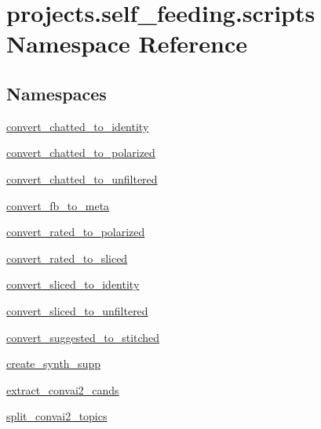 \hypertarget{namespaceprojects_1_1self__feeding_1_1scripts}{}\section{projects.\+self\+\_\+feeding.\+scripts Namespace Reference}
\label{namespaceprojects_1_1self__feeding_1_1scripts}
\subsection*{Namespaces}
\begin{DoxyCompactItemize}
\item 
 \hyperlink{namespaceprojects_1_1self__feeding_1_1scripts_1_1convert__chatted__to__identity}{convert\+\_\+chatted\+\_\+to\+\_\+identity}
\item 
 \hyperlink{namespaceprojects_1_1self__feeding_1_1scripts_1_1convert__chatted__to__polarized}{convert\+\_\+chatted\+\_\+to\+\_\+polarized}
\item 
 \hyperlink{namespaceprojects_1_1self__feeding_1_1scripts_1_1convert__chatted__to__unfiltered}{convert\+\_\+chatted\+\_\+to\+\_\+unfiltered}
\item 
 \hyperlink{namespaceprojects_1_1self__feeding_1_1scripts_1_1convert__fb__to__meta}{convert\+\_\+fb\+\_\+to\+\_\+meta}
\item 
 \hyperlink{namespaceprojects_1_1self__feeding_1_1scripts_1_1convert__rated__to__polarized}{convert\+\_\+rated\+\_\+to\+\_\+polarized}
\item 
 \hyperlink{namespaceprojects_1_1self__feeding_1_1scripts_1_1convert__rated__to__sliced}{convert\+\_\+rated\+\_\+to\+\_\+sliced}
\item 
 \hyperlink{namespaceprojects_1_1self__feeding_1_1scripts_1_1convert__sliced__to__identity}{convert\+\_\+sliced\+\_\+to\+\_\+identity}
\item 
 \hyperlink{namespaceprojects_1_1self__feeding_1_1scripts_1_1convert__sliced__to__unfiltered}{convert\+\_\+sliced\+\_\+to\+\_\+unfiltered}
\item 
 \hyperlink{namespaceprojects_1_1self__feeding_1_1scripts_1_1convert__suggested__to__stitched}{convert\+\_\+suggested\+\_\+to\+\_\+stitched}
\item 
 \hyperlink{namespaceprojects_1_1self__feeding_1_1scripts_1_1create__synth__supp}{create\+\_\+synth\+\_\+supp}
\item 
 \hyperlink{namespaceprojects_1_1self__feeding_1_1scripts_1_1extract__convai2__cands}{extract\+\_\+convai2\+\_\+cands}
\item 
 \hyperlink{namespaceprojects_1_1self__feeding_1_1scripts_1_1split__convai2__topics}{split\+\_\+convai2\+\_\+topics}
\end{DoxyCompactItemize}
